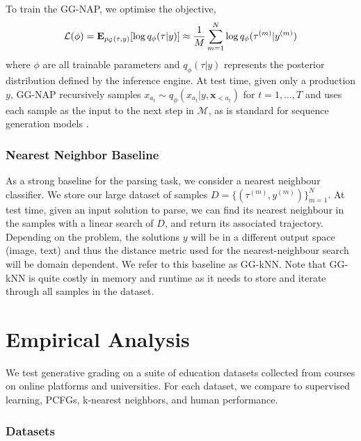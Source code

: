 To train the GG-NAP, we optimise the objective,
\begin{equation}
    \small
    \mathcal{L}(\phi) = \mathbf{E}_{p_\mathcal{G}(\tau,y)}[\log q_\phi(\tau|y)] \approx \frac{1}{M}\sum_{m=1}^{N} \log q_\phi(\tau^{(m)} | y^{(m)})
    \label{eqn:objective}
\end{equation}
where $\phi$ are all trainable parameters and $q_\phi(\tau|y)$ represents the posterior distribution defined by the inference engine. 
At test time, given only a production $y$, GG-NAP recursively samples $x_{a_{t}} \sim q_\phi(x_{a_{t}}|y, \mathbf{x}_{<a_t})$ for $t = 1, \ldots, T$ and uses each sample as the input to the next step in $\mathcal{M}$, as is standard for sequence generation models \cite{graves_char_rnn}. 

\subsubsection{Nearest Neighbor Baseline}

As a strong baseline for the parsing task, we consider a nearest neighbour classifier. We store our large dataset of samples $D = \{ (\tau^{(m)}, y^{(m)}) \}_{m=1}^N$. At test time, given an input solution to parse, we can find its nearest neighbour in the samples with a linear search of $D$, and return its associated trajectory. Depending on the problem, the solutions $y$ will be in a different output space (image, text) and thus the distance metric used for the nearest-neighbour search will be domain dependent. We refer to this baseline as GG-kNN. Note that GG-kNN is quite costly in memory and runtime as it needs to store and iterate through all samples in the dataset.


\section{Empirical Analysis}
\label{sec:experiments}

We test generative grading on a suite of education datasets collected from courses on online platforms and  universities. 
For each dataset, we compare to supervised learning, PCFGs, k-nearest neighbors, and human performance.

\subsubsection{Datasets}
\label{sec:datasets}

